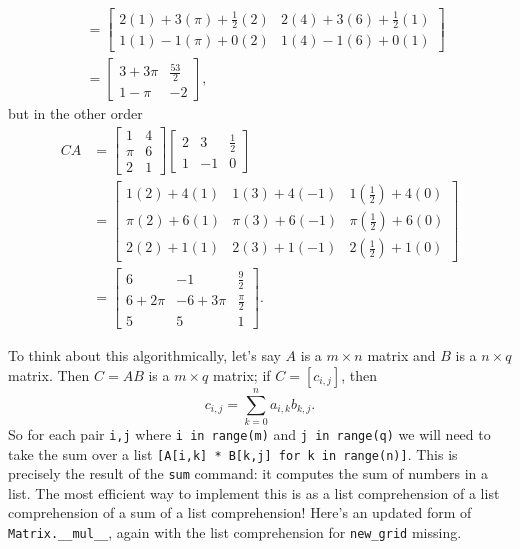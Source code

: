 \documentclass[m3380-lec-main.tex]{subfiles}
\begin{document}
\begin{exmp}
\begin{align*}
&=	\begin{bmatrix} 
		2(1)+3(\pi)+\frac12(2) & 2(4)+3(6)+\frac12(1) \\
		1(1)-1(\pi)+0(2) & 1(4)-1(6)+0(1)
	\end{bmatrix} \\
&=	\begin{bmatrix}
		3+3\pi & \frac{53}2 \\
		1-\pi & -2
	\end{bmatrix},
\end{align*}
but in the other order
\begin{align*}
CA &=
	\begin{bmatrix}1 & 4 \\ \pi & 6 \\ 2 & 1\end{bmatrix}
	\begin{bmatrix}2 & 3 & \frac12 \\ 1 & -1 & 0 \end{bmatrix} \\
&=	\begin{bmatrix}
		1(2)+4(1) & 1(3)+4(-1) & 1\left(\frac12\right)+4(0) \\
		\pi(2)+6(1) & \pi(3)+6(-1) & \pi\left(\frac12\right)+6(0) \\
		2(2)+1(1) & 2(3)+1(-1) & 2\left(\frac12\right)+1(0)
	\end{bmatrix} \\
&=	\begin{bmatrix}
		6 & -1 & \frac92 \\
		6+2\pi & -6+3\pi & \frac{\pi}2 \\
		5 & 5 & 1
	\end{bmatrix}.
\end{align*}
\end{exmp}

To think about this algorithmically, let's say $A$ is a $m\times n$ matrix and $B$ is a $n\times q$ matrix. Then $C = AB$ is a $m\times q$ matrix; if $C = [c_{i,j}]$, then 
\[ c_{i,j} = \sum_{k=0}^n a_{i,k}b_{k,j}. \]
So for each pair \verb|i,j| where \verb|i in range(m)| and \verb|j in range(q)| we will need to take the sum over a list \verb|[A[i,k] * B[k,j] for k in range(n)]|. This is precisely the result of the \verb|sum| command: it computes the sum of numbers in a list. The most efficient way to implement this is as a list comprehension of a list comprehension of a sum of a list comprehension!
Here's an updated form of \verb|Matrix.__mul__|, again with the list comprehension for \verb|new_grid| missing.
\end{document}
